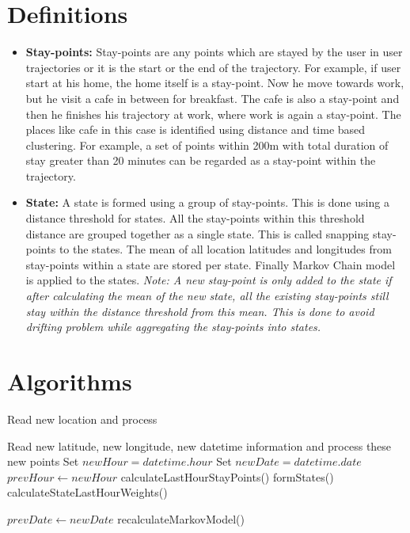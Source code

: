 \documentclass{article}
\begin{document}
\section{Definitions}
\begin{itemize}
	\item \textbf{Stay-points:} Stay-points are any points which are stayed by the user in user trajectories or it is the start or the end of the trajectory. For example, if user start at his home, the home itself is a stay-point. Now he move towards work, but he visit a cafe in between for breakfast. The cafe is also a stay-point and then he finishes his trajectory at work, where work is again a stay-point. The places like cafe in this case is identified using distance and time based clustering. For example, a set of points within 200m with total duration of stay greater than 20 minutes can be regarded as a stay-point within the trajectory.
	\item \textbf{State:} A state is formed using a group of stay-points. This is done using a distance threshold for states. All the stay-points within this threshold distance are grouped together as a single state. This is called snapping stay-points to the states. The mean of all location latitudes and longitudes from stay-points within a state are stored per state. Finally Markov Chain model is applied to the states. \textit{Note: A new stay-point is only added to the state if after calculating the mean of the new state, all the existing stay-points still stay within the distance threshold from this mean. This is done to avoid drifting problem while aggregating the stay-points into states.}
\end{itemize}

\section{Algorithms}

\begin{algorithm}
\caption{Read new location and process}
\label{pseudoPSO}
\begin{algorithmic}[1]
\State Read new latitude, new longitude, new datetime information and process these new points
\State Set $newHour = datetime.hour $
\State Set $newDate = datetime.date $
	\State $prevHour \gets newHour$
	\State calculateLastHourStayPoints()
	\State formStates()
	\State calculateStateLastHourWeights()
\EndIf
    
	\State $prevDate \gets newDate$
	\State recalculateMarkovModel()
\EndIf
\EndWhile
\end{algorithmic}
\end{algorithm}
\end{document}
